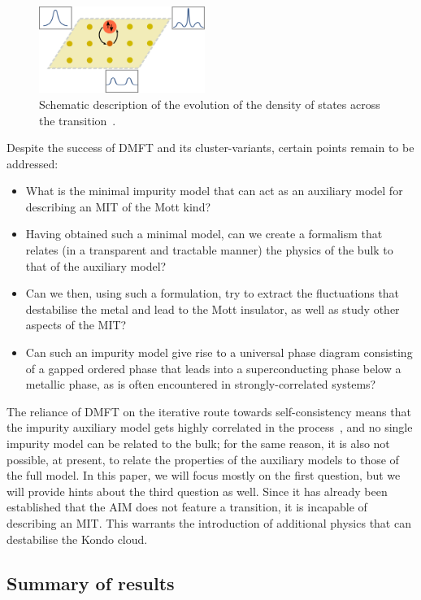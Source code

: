 \documentclass[reprint,superscriptaddress,floatfix]{revtex4-2}
\begin{document}
\begin{figure}[!htb]
	\centering
	\includegraphics[width=0.48\textwidth]{DMFT.pdf}
	\caption{Schematic description of the evolution of the density of states across the transition~\cite{zhang_1993}.}
	\label{spec-func_scheme}
\end{figure}

Despite the success of DMFT and its cluster-variants, certain points remain to be addressed:
\begin{itemize}
	\item What is the minimal impurity model that can act as an auxiliary model for describing an MIT of the Mott kind?
	\item Having obtained such a minimal model, can we create a formalism that relates (in a transparent and tractable manner) the physics of the bulk to that of the auxiliary model?
	\item Can we then, using such a formulation, try to extract the fluctuations that destabilise the metal and lead to the Mott insulator, as well as study other aspects of the MIT?
	\item {\color{blue}Can such an impurity model give rise to a universal phase diagram consisting of a gapped ordered phase that leads into a superconducting phase below a metallic phase, as is often encountered in strongly-correlated systems?}
\end{itemize}
The reliance of DMFT on the iterative route towards self-consistency means that the impurity auxiliary model gets highly correlated in the process~\cite{held2008}, and no single impurity model can be related to the bulk; for the same reason, it is also not possible, at present, to relate the properties of the auxiliary models to those of the full model. In this {\color{blue}paper}, we will focus mostly on the first question, but we will provide hints about the third question as well. Since it has already been established that the AIM does not feature a transition, it is incapable of describing an MIT. This warrants the introduction of additional physics that can destabilise the Kondo cloud.

\subsection*{Summary of results}
\end{document}
